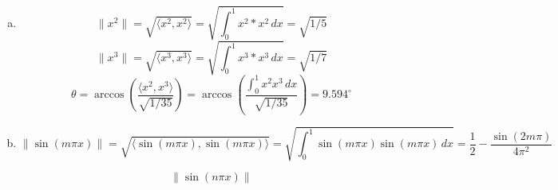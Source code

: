 \documentclass[12pt]{article}
\begin{document}
\section{}
\begin{enumerate}[(a)]
	\item \[ \|x^2\| = \sqrt{\langle x^2, x^2 \rangle} = \sqrt{\int_{0}^{1} x^2 * x^2 \,dx} = \sqrt{1/5}\]
	\[ \|x^3\| = \sqrt{\langle x^3, x^3 \rangle} = \sqrt{\int_{0}^{1} x^3 * x^3 \,dx} = \sqrt{1/7}\]
	\[\theta = \arccos\left(\dfrac{\langle x^2, x^3 \rangle}{\sqrt{1/35}}\right) = \arccos\left(\dfrac{\int_{0}^{1} x^2 x^3 \,dx}{\sqrt{1/35}}\right) = 9.594^{\circ}\]
	
	\item \[ \|\sin(m\pi x)\| = \sqrt{\langle \sin(m\pi x), \sin(m\pi x) \rangle} = \sqrt{\int_{0}^{1} \sin(m\pi x)\sin(m\pi x)\, dx} = \dfrac{1}{2} - \dfrac{\sin(2m\pi )}{4\pi^2}\]
	
	\[\|\sin(n\pi x)\|  \]
\end{enumerate}
\end{document}

